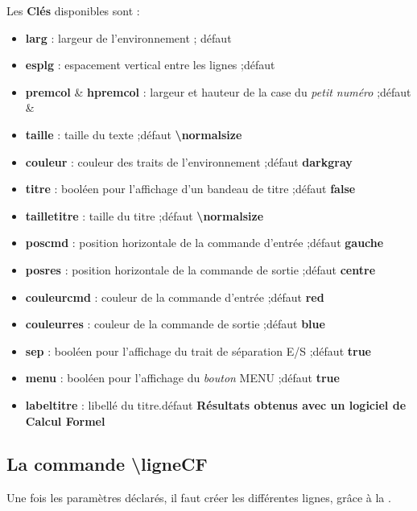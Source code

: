 \documentclass{article}
\newcommand\ctex[1]{\tcbox[vignettelatex]{#1}}
\newcommand\Cle[1]{{\bfseries\sffamily\textlangle #1\textrangle}}
\begin{document}
\begin{codecles}
Les \Cle{Clés} disponibles sont :
\begin{itemize}
	\item \Cle{larg} : largeur de l'environnement ; \hfill{}défaut \Cle{16}
	\item \Cle{esplg} : espacement vertical entre les lignes ;\hfill{}défaut \Cle{2pt}
	\item \Cle{premcol} \& \Cle{hpremcol} : largeur et hauteur de la case du \textit{petit numéro} ;\hfill{}défaut \Cle{0.3} \&  \Cle{0.4}
	\item \Cle{taille} : taille du texte ;\hfill{}défaut \Cle{\textbackslash normalsize}
	\item \Cle{couleur} : couleur des traits de l'environnement ;\hfill{}défaut \Cle{darkgray}
	\item \Cle{titre} : booléen pour l'affichage d'un bandeau de titre ;\hfill{}défaut \Cle{false}
	\item \Cle{tailletitre} : taille du titre ;\hfill{}défaut \Cle{\textbackslash normalsize}
	\item \Cle{poscmd} : position horizontale de la commande d'entrée ;\hfill{}défaut \Cle{gauche}
	\item \Cle{posres} : position horizontale de la commande de sortie ;\hfill{}défaut \Cle{centre}
	\item \Cle{couleurcmd} : couleur de la commande d'entrée ;\hfill{}défaut \Cle{red}
	\item \Cle{couleurres} : couleur de la commande de sortie ;\hfill{}défaut \Cle{blue}
	\item \Cle{sep} : booléen pour l'affichage du trait de séparation E/S ;\hfill{}défaut \Cle{true}
	\item \Cle{menu} : booléen pour l'affichage du \textit{bouton} MENU ;\hfill{}défaut \Cle{true}
	\item \Cle{labeltitre} : libellé du titre.\hfill{}défaut \Cle{Résultats obtenus avec un logiciel de Calcul Formel}
\end{itemize}
\end{codecles}

\subsection{La commande \og \textbackslash{}ligneCF \fg}

\begin{codeinfo}
Une fois les paramètres déclarés, il faut créer les différentes lignes, grâce à la \ctex{ligneCF}.
\end{codeinfo}
\end{document}

